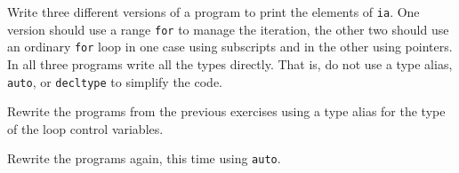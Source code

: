 %
%
\begin{question}
Write three different versions of a program to print the
elements of \verb|ia|. One version should use a range \verb|for| to manage the
iteration, the other two should use an ordinary \verb|for| loop in one case using
subscripts and in the other using pointers. In all three programs write all the
types directly. That is, do not use a type alias, \verb|auto|, or \verb|decltype| to
simplify the code.
\end{question}

\begin{question}
Rewrite the programs from the previous exercises using a
type alias for the type of the loop control variables.
\end{question}

\begin{question}
Rewrite the programs again, this time using \verb|auto|.
\end{question}
